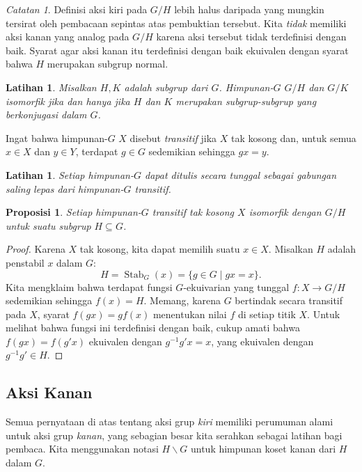 \documentclass[12pt]{article}
\theoremstyle{plain}
\newtheorem{proposition}[theorem]{Proposisi}
\newtheorem{exercise}[theorem]{Latihan}
\theoremstyle{definition}
\theoremstyle{remark}
\newtheorem{remark}[theorem]{Catatan}
\numberwithin{equation}{section}
\begin{document}
\begin{remark}
Definisi aksi kiri pada $G/H$ lebih halus daripada yang mungkin tersirat oleh
pembacaan sepintas atas pembuktian tersebut.
Kita \emph{tidak} memiliki aksi kanan yang analog pada $G/H$
karena aksi tersebut tidak terdefinisi dengan baik. Syarat agar aksi kanan itu
terdefinisi dengan baik ekuivalen dengan syarat bahwa $H$ merupakan subgrup normal.
\end{remark}

\begin{exercise}
Misalkan $H,K$ adalah subgrup dari $G$.
Himpunan-$G$ $G/H$ dan $G/K$ isomorfik jika dan hanya jika
$H$ dan $K$ merupakan subgrup-subgrup yang berkonjugasi dalam $G$.
\end{exercise}

Ingat bahwa himpunan-$G$ $X$ disebut \emph{transitif} jika $X$ tak kosong
dan, untuk semua $x \in X$ dan
$y \in Y$, terdapat $g \in G$ sedemikian sehingga $gx=y$.

\begin{exercise}
Setiap himpunan-$G$ dapat ditulis secara tunggal sebagai gabungan saling lepas dari
himpunan-$G$ transitif.
\end{exercise}

\begin{proposition}
Setiap himpunan-$G$ transitif tak kosong $X$ isomorfik dengan $G/H$
untuk suatu subgrup $H \subseteq G$.
\end{proposition}

\begin{proof}
Karena $X$ tak kosong, kita dapat memilih suatu $x \in X$.
Misalkan $H$ adalah penstabil $x$ dalam $G$:
\[
H = \operatorname{Stab}_G(x) = \{ g \in G \mid gx=x \}.
\]
Kita mengklaim bahwa terdapat fungsi $G$-ekuivarian yang tunggal
$f : X \to G/H$ sedemikian sehingga $f(x)=H$.
Memang, karena $G$ bertindak secara transitif pada $X$,
syarat $f(gx)=gf(x)$ menentukan nilai $f$ di setiap titik
$X$. Untuk melihat bahwa fungsi ini terdefinisi dengan baik, cukup amati bahwa
$f(gx)=f(g'x)$ ekuivalen dengan $g^{-1}g'x=x$, yang ekuivalen dengan
$g^{-1}g' \in H$.
\end{proof}

\subsection{Aksi Kanan}

Semua pernyataan di atas tentang aksi grup \emph{kiri} memiliki
perumuman alami untuk aksi grup \emph{kanan}, yang sebagian besar kita serahkan sebagai
latihan bagi pembaca.
Kita menggunakan notasi $H \backslash G$ untuk himpunan koset kanan dari $H$
dalam $G$.
\end{document}
